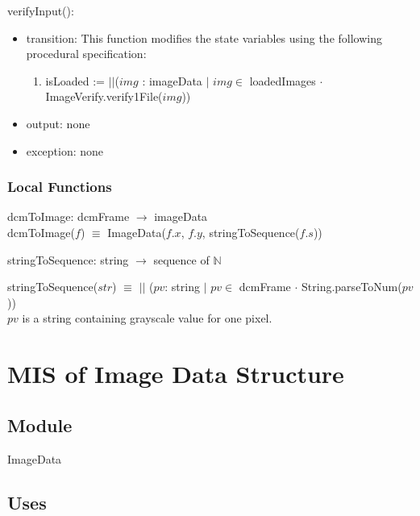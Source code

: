 \documentclass[12pt, titlepage]{article}
\begin{document}
\noindent verifyInput():
\begin{itemize}
\item transition: 
This function modifies the state variables using the following procedural
specification:
\begin{enumerate}
    \item
isLoaded := $||$($img$ : imageData $|$ $img \in$ loadedImages $\cdot$
ImageVerify.verify1File($img$))
\end{enumerate}
\item output: none 
\item exception: none
\end{itemize}


\subsubsection{Local Functions}

\noindent dcmToImage: dcmFrame $\rightarrow$ imageData\\
\noindent dcmToImage($f$) $\equiv$ ImageData($f.x$, $f.y$,
stringToSequence($f.s$))

\noindent stringToSequence: string $\rightarrow$ sequence of $\mathbb{N}$

\noindent stringToSequence($str$) $\equiv$
$||$ ($pv$: string $|$ $pv \in$ dcmFrame $\cdot$ String.parseToNum($pv$))\\
$pv$ is a string containing grayscale value for one pixel.

\newpage

\section{MIS of Image Data Structure} \label{Md_ImageDS}
\subsection{Module}

ImageData

\subsection{Uses}
\end{document}
